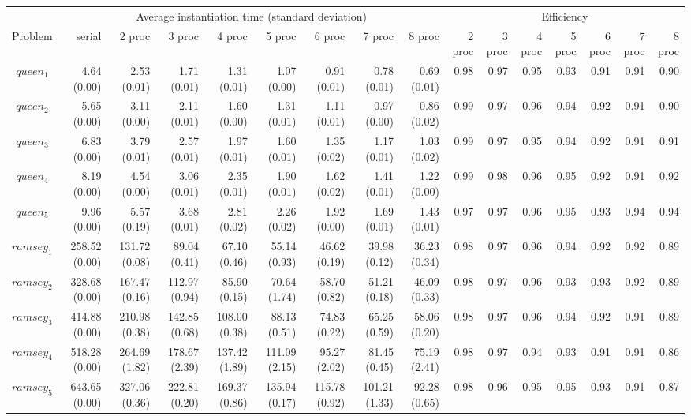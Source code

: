\documentclass[preprint]{tlp}
\begin{document}
\begin{landscape}

\scriptsize
\begin{tabular}{@{\extracolsep{\fill}}|c|r|r|r|r|r|r|r|r||r|r|r|r|r|r|r|}
\cline{1-16}
&\multicolumn{8}{c||}{Average instantiation time (standard deviation)}& \multicolumn{7}{c|}{Efficiency}\\
\cline{1-16}
Problem & serial & 2 proc  & 3 proc & 4 proc & 5 proc & 6 proc & 7 proc & 8 proc &  2 proc  & 3 proc & 4 proc & 5 proc & 6 proc & 7 proc & 8 proc\\
\cline{1-16}
$queen_1$ & 4.64 (0.00) & 2.53 (0.01) & 1.71 (0.01) & 1.31 (0.01) & 1.07 (0.00) & 0.91 (0.01) & 0.78 (0.01) & 0.69 (0.01)&0.98 & 0.97 & 0.95 & 0.93 & 0.91 & 0.91 & 0.90\\
$queen_2$ & 5.65 (0.00) & 3.11 (0.00) & 2.11 (0.01) & 1.60 (0.00) & 1.31 (0.01) & 1.11 (0.01) & 0.97 (0.00) & 0.86 (0.02)&0.99 & 0.97 & 0.96 & 0.94 & 0.92 & 0.91 & 0.90\\
$queen_3$ & 6.83 (0.00) & 3.79 (0.01) & 2.57 (0.01) & 1.97 (0.01) & 1.60 (0.01) & 1.35 (0.02) & 1.17 (0.01) & 1.03 (0.02)&0.99 & 0.97 & 0.95 & 0.94 & 0.92 & 0.91 & 0.91\\
$queen_4$ & 8.19 (0.00) & 4.54 (0.00) & 3.06 (0.01) & 2.35 (0.01) & 1.90 (0.01) & 1.62 (0.02) & 1.41 (0.01) & 1.22 (0.00)&0.99 & 0.98 & 0.96 & 0.95 & 0.92 & 0.91 & 0.92 \\
$queen_5$ &  9.96 (0.00) & 5.57 (0.19) & 3.68 (0.01) & 2.81 (0.02) & 2.26 (0.02) & 1.92 (0.00) & 1.69 (0.01) & 1.43 (0.01)&0.97 & 0.97 & 0.96 & 0.95 & 0.93 & 0.94 & 0.94 \\
\cline{1-16}
$ramsey_1$ & 258.52 (0.00) & 131.72 (0.08) & 89.04 (0.41) & 67.10 (0.46) & 55.14 (0.93) & 46.62 (0.19) & 39.98 (0.12) & 36.23 (0.34)& 0.98 & 0.97 & 0.96 & 0.94 & 0.92 & 0.92 & 0.89 \\
$ramsey_2$ & 328.68 (0.00) & 167.47 (0.16) & 112.97 (0.94) & 85.90 (0.15) & 70.64 (1.74) & 58.70 (0.82) & 51.21 (0.18) & 46.09 (0.33)& 0.98 & 0.97 & 0.96 & 0.93 & 0.93 & 0.92 & 0.89 \\
$ramsey_3$ & 414.88 (0.00) & 210.98 (0.38) & 142.85 (0.68) & 108.00 (0.38) & 88.13 (0.51) & 74.83 (0.22) & 65.25 (0.59) & 58.06 (0.20)& 0.98 & 0.97 & 0.96 & 0.94 & 0.92 & 0.91 & 0.89 \\
$ramsey_4$ & 518.28 (0.00) & 264.69 (1.82) & 178.67 (2.39) & 137.42 (1.89) & 111.09 (2.15) & 95.27 (2.02) & 81.45 (0.45) & 75.19 (2.41)& 0.98 & 0.97 & 0.94 & 0.93 & 0.91 & 0.91 & 0.86\\
$ramsey_5$ & 643.65 (0.00) & 327.06 (0.36) & 222.81 (0.20) & 169.37 (0.86) & 135.94 (0.17) & 115.78 (0.92) & 101.21 (1.33) & 92.28 (0.65)& 0.98 & 0.96 & 0.95 & 0.95 & 0.93 & 0.91 & 0.87 \\

\end{tabular}
\end{landscape}
\end{document}
